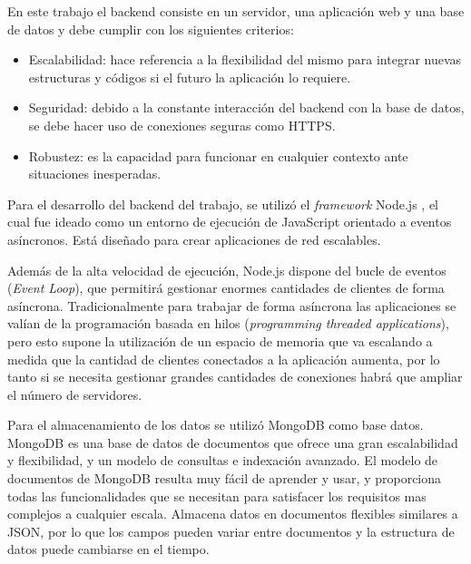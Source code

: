 En este trabajo el backend consiste en un servidor, una aplicación web y una base de datos y debe cumplir con los siguientes criterios:

\begin{itemize}
	\item Escalabilidad: hace referencia a la flexibilidad del mismo para integrar nuevas estructuras y códigos si el futuro la aplicación lo requiere.
	
	\item Seguridad: debido a la constante interacción del backend con la base de datos, se debe hacer uso de conexiones seguras como HTTPS.
	
	\item Robustez: es la capacidad para funcionar en cualquier contexto ante situaciones inesperadas.
	
\end{itemize}

Para el desarrollo del backend del trabajo, se utilizó el \textit{framework} Node.js \citep{WEBSITE:19} ,  el cual fue ideado como un entorno de ejecución de JavaScript orientado a eventos asíncronos. Está diseñado para crear aplicaciones de red escalables.

Además de la alta velocidad de ejecución, Node.js dispone del bucle de eventos (\textit{Event Loop}), que permitirá gestionar enormes cantidades de clientes de forma asíncrona. Tradicionalmente para trabajar de forma asíncrona las aplicaciones se valían de la programación basada en hilos (\textit{programming threaded applications}), pero esto supone la utilización de un espacio de memoria que va escalando a medida que la cantidad de clientes conectados a la aplicación aumenta, por lo tanto si se necesita gestionar grandes cantidades de conexiones habrá que ampliar el número de servidores.

Para el almacenamiento de los datos se utilizó MongoDB \citep{WEBSITE:20} como base datos.  MongoDB es una base de datos de documentos que ofrece una gran escalabilidad y flexibilidad,  y un modelo de consultas e indexación avanzado. El modelo de documentos de MongoDB resulta muy fácil de aprender y usar, y proporciona todas las funcionalidades que se necesitan para satisfacer los requisitos mas complejos a cualquier escala. Almacena datos en documentos flexibles similares a JSON, por lo que los campos pueden variar entre documentos y la estructura de datos puede cambiarse en el tiempo.




